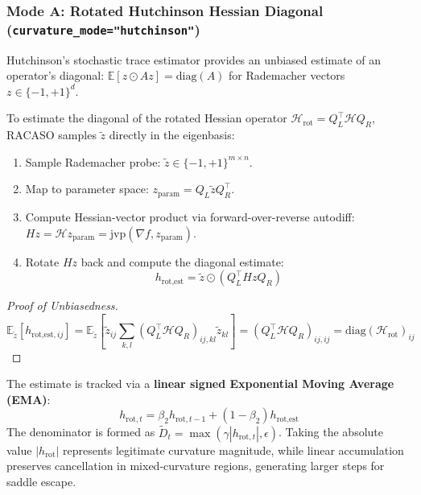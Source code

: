 \documentclass[11pt,a4paper]{article}
\begin{document}
\subsubsection{Mode A: Rotated Hutchinson Hessian Diagonal (\texttt{curvature\_mode="hutchinson"})}
Hutchinson's stochastic trace estimator provides an unbiased estimate of an operator's diagonal: $\mathbb{E}[z \odot A z] = \text{diag}(A)$ for Rademacher vectors $z \in \{-1, +1\}^d$. 

To estimate the diagonal of the rotated Hessian operator $\mathcal{H}_{\text{rot}} = Q_L^\top \mathcal{H} Q_R$, RACASO samples $\tilde{z}$ directly in the eigenbasis:
\begin{enumerate}
    \item Sample Rademacher probe: $\tilde{z} \in \{-1, +1\}^{m \times n}$.
    \item Map to parameter space: $z_{\text{param}} = Q_L \tilde{z} Q_R^\top$.
    \item Compute Hessian-vector product via forward-over-reverse autodiff: $Hz = \mathcal{H} z_{\text{param}} = \text{jvp}(\nabla f, z_{\text{param}})$.
    \item Rotate $Hz$ back and compute the diagonal estimate:
    \begin{equation}
    h_{\text{rot,est}} = \tilde{z} \odot (Q_L^\top Hz Q_R)
    \end{equation}
\end{enumerate}

\begin{proof}[Proof of Unbiasedness]
\begin{equation}
\mathbb{E}_{\tilde{z}}[h_{\text{rot,est}, ij}] = \mathbb{E}_{\tilde{z}}\left[\tilde{z}_{ij} \sum_{k,l} (Q_L^\top \mathcal{H} Q_R)_{ij, kl} \tilde{z}_{kl}\right] = (Q_L^\top \mathcal{H} Q_R)_{ij, ij} = \text{diag}(\mathcal{H}_{\text{rot}})_{ij}
\end{equation}
\end{proof}

The estimate is tracked via a \textbf{linear signed Exponential Moving Average (EMA)}:
\begin{equation}
h_{\text{rot}, t} = \beta_2 h_{\text{rot}, t-1} + (1 - \beta_2) h_{\text{rot,est}}
\end{equation}
The denominator is formed as $\tilde{D}_t = \max(\gamma |h_{\text{rot}, t}|, \epsilon)$. Taking the absolute value $|h_{\text{rot}}|$ represents legitimate curvature magnitude, while linear accumulation preserves cancellation in mixed-curvature regions, generating larger steps for saddle escape.
\end{document}
